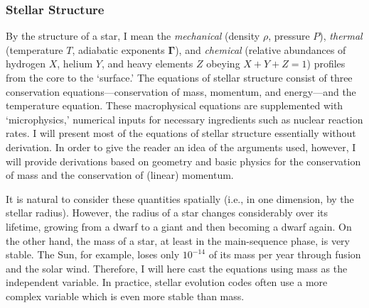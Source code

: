 \subsubsection*{Stellar Structure}
By the structure of a star, I mean the \emph{mechanical} (density $\rho$, pressure $P$), \emph{thermal} (temperature $T$, adiabatic exponents $\boldsymbol\Gamma$), and \emph{chemical} (relative abundances of hydrogen $X$, helium $Y$, and heavy elements $Z$ obeying ${X+Y+Z=1}$) profiles from the core to the `surface.' 
The equations of stellar structure consist of three conservation equations---conservation of mass, momentum, and energy---and the temperature equation. 
These macrophysical equations are supplemented with `microphysics,' numerical inputs for necessary ingredients such as nuclear reaction rates. 
I will present most of the equations of stellar structure essentially without derivation. 
In order to give the reader an idea of the arguments used, however, I will provide derivations based on geometry and basic physics for the conservation of mass and the conservation of (linear) momentum. 

It is natural to consider these quantities spatially (i.e., in one dimension, by the stellar radius). 
However, the radius of a star changes considerably over its lifetime, growing from a dwarf to a giant and then becoming a dwarf again. 
On the other hand, the mass of a star, at least in the main-sequence phase, is very stable. 
The Sun, for example, loses only $10^{-14}$ of its mass per year through fusion and the solar wind. 
Therefore, I will here cast the equations using mass as the independent variable. 
In practice, stellar evolution codes often use a more complex variable which is even more stable than mass. 

